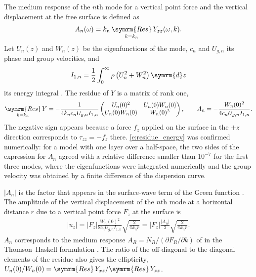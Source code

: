 \documentclass[a4paper, 10pt]{article}
\begin{document}
The medium response of the $n$th mode for a vertical point force and the vertical displacement at the free surface is defined as
\begin{align}
  A_n(\omega) = k_n \mathop{\symrm{Res}}_{k = k_n} Y_{zz}(\omega, k).
  \label{e:medium_response}
\end{align}
Let $U_n(z)$ and $W_n(z)$ be the eigenfunctions of the mode, $c_n$ and $U_{g,n}$ its phase and group velocities, and
\begin{align}
  I_{1,n} = \frac{1}{2} \int_0^\infty \rho \left( U_n^2 + W_n^2 \right) \symrm{d}z
\end{align}
its energy integral \parencite[eq.~7.74 of][]{aki2002}.
The residue of $Y$ is a matrix of rank one,
\begin{align}
  \mathop{\symrm{Res}}_{k = k_n} Y =
  -\frac{1}{4 k_n c_n U_{g,n} I_{1,n}}
  \begin{pmatrix}
    U_n(0)^2 & U_n(0) W_n(0) \\
    U_n(0) W_n(0) & W_n(0)^2
  \end{pmatrix},
  \qquad
  A_n = -\frac{W_n(0)^2}{4 c_n U_{g,n} I_{1,n}}.
  \label{e:residue_energy}
\end{align}
The negative sign appears because a force $f_z$ applied on the surface in the $+z$ direction corresponds to $\tau_{zz} = -f_z$ there.
\eqref{e:residue_energy} was confirmed numerically: for a model with one layer over a half-space, the two sides of the expression for $A_n$ agreed with a relative difference smaller than $10^{-7}$ for the first three modes, where the eigenfunctions were integrated numerically and the group velocity was obtained by a finite difference of the dispersion curve.

$|A_n|$ is the factor that appears in the surface-wave term of the Green function \parencite[eqs.~7.144 and 7.147 of][]{aki2002}.
The amplitude of the vertical displacement of the $n$th mode at a horizontal distance $r$ due to a vertical point force $F_z$ at the surface is
\begin{align}
  \left| u_z \right| =
  \left| F_z \right| \frac{W_n(0)^2}{8 c_n U_{g,n} I_{1,n}} \sqrt{\frac{2}{\pi k_n r}}
  =
  \left| F_z \right| \frac{\left| A_n \right|}{2} \sqrt{\frac{2}{\pi k_n r}}.
  \label{e:far_field}
\end{align}
$A_n$ corresponds to the medium response $A_R = N_R / (\partial F_R / \partial k)$ of \textcite{harkrider1964} in the Thomson--Haskell formulation \parencite{haskell1953}.
The ratio of the off-diagonal to the diagonal elements of the residue also gives the ellipticity, $U_n(0) / W_n(0) = \symrm{Res}\, Y_{xz} / \symrm{Res}\, Y_{zz}$.
\end{document}
